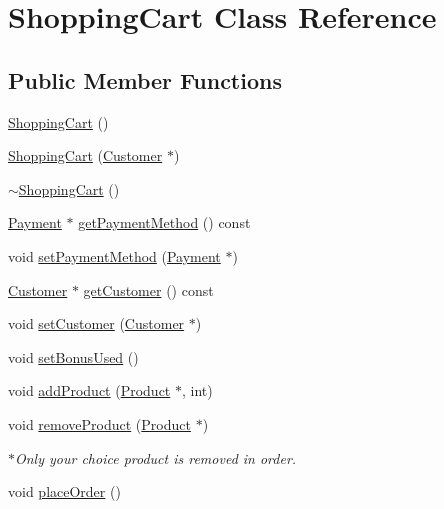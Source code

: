 \hypertarget{classShoppingCart}{}\section{Shopping\+Cart Class Reference}
\label{classShoppingCart}
\subsection*{Public Member Functions}
\begin{DoxyCompactItemize}
\item 
\hyperlink{classShoppingCart_aa499286a2d3e4fcea8ee97a15f6d54c0}{Shopping\+Cart} ()
\item 
\hyperlink{classShoppingCart_af7a004471b1321cd7ee3b725be7bc7d7}{Shopping\+Cart} (\hyperlink{classCustomer}{Customer} $\ast$)
\item 
\hyperlink{classShoppingCart_a9a042afb412e560720b74920f5fac50a}{$\sim$\+Shopping\+Cart} ()
\item 
\hyperlink{classPayment}{Payment} $\ast$ \hyperlink{classShoppingCart_ada58cd717f897b9f3c1a2e042674a26b}{get\+Payment\+Method} () const 
\item 
void \hyperlink{classShoppingCart_a1648a74b6b51553740a964d39732f62a}{set\+Payment\+Method} (\hyperlink{classPayment}{Payment} $\ast$)
\item 
\hyperlink{classCustomer}{Customer} $\ast$ \hyperlink{classShoppingCart_a765e303006757a4e01ad2c6729afca9a}{get\+Customer} () const 
\item 
void \hyperlink{classShoppingCart_afa31abf8f6244304419f4e6caf3b109c}{set\+Customer} (\hyperlink{classCustomer}{Customer} $\ast$)
\item 
void \hyperlink{classShoppingCart_a2ed167d69492c61daf08754b4e3f99cf}{set\+Bonus\+Used} ()
\item 
void \hyperlink{classShoppingCart_afcab6367adfc0be9e37dd037a43b4ce2}{add\+Product} (\hyperlink{classProduct}{Product} $\ast$, int)
\item 
void \hyperlink{classShoppingCart_ad82371a6788905b99e6a03e3cd359242}{remove\+Product} (\hyperlink{classProduct}{Product} $\ast$)
\begin{DoxyCompactList}\small\item\em $\ast$\+Only your choice product is removed in order. \end{DoxyCompactList}\item 
void \hyperlink{classShoppingCart_af02e91c37822093ea7d8a2d63e8601a4}{place\+Order} ()\hypertarget{classShoppingCart_af02e91c37822093ea7d8a2d63e8601a4}{}\label{classShoppingCart_af02e91c37822093ea7d8a2d63e8601a4}


\end{DoxyCompactItemize}
